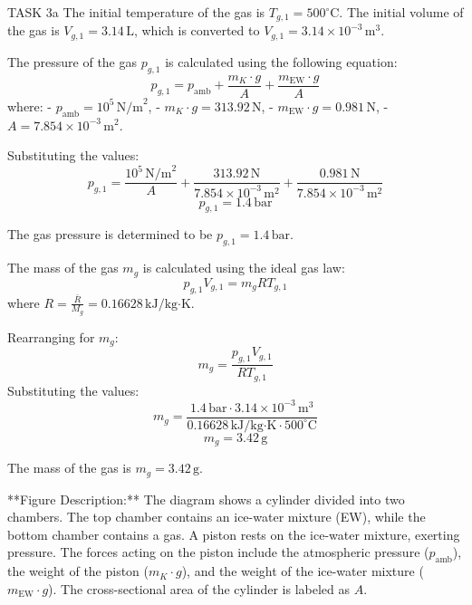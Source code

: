TASK 3a  
The initial temperature of the gas is \( T_{g,1} = 500^\circ\text{C} \).  
The initial volume of the gas is \( V_{g,1} = 3.14 \, \text{L} \), which is converted to \( V_{g,1} = 3.14 \times 10^{-3} \, \text{m}^3 \).  

The pressure of the gas \( p_{g,1} \) is calculated using the following equation:  
\[
p_{g,1} = p_{\text{amb}} + \frac{m_K \cdot g}{A} + \frac{m_{\text{EW}} \cdot g}{A}
\]  
where:  
- \( p_{\text{amb}} = 10^5 \, \text{N/m}^2 \),  
- \( m_K \cdot g = 313.92 \, \text{N} \),  
- \( m_{\text{EW}} \cdot g = 0.981 \, \text{N} \),  
- \( A = 7.854 \times 10^{-3} \, \text{m}^2 \).  

Substituting the values:  
\[
p_{g,1} = \frac{10^5 \, \text{N/m}^2}{A} + \frac{313.92 \, \text{N}}{7.854 \times 10^{-3} \, \text{m}^2} + \frac{0.981 \, \text{N}}{7.854 \times 10^{-3} \, \text{m}^2}
\]  
\[
p_{g,1} = 1.4 \, \text{bar}
\]  

The gas pressure is determined to be \( p_{g,1} = 1.4 \, \text{bar} \).  

The mass of the gas \( m_g \) is calculated using the ideal gas law:  
\[
p_{g,1} V_{g,1} = m_g R T_{g,1}
\]  
where \( R = \frac{\bar{R}}{M_g} = 0.16628 \, \text{kJ/kg·K} \).  

Rearranging for \( m_g \):  
\[
m_g = \frac{p_{g,1} V_{g,1}}{R T_{g,1}}
\]  
Substituting the values:  
\[
m_g = \frac{1.4 \, \text{bar} \cdot 3.14 \times 10^{-3} \, \text{m}^3}{0.16628 \, \text{kJ/kg·K} \cdot 500^\circ\text{C}}
\]  
\[
m_g = 3.42 \, \text{g}
\]  

The mass of the gas is \( m_g = 3.42 \, \text{g} \).  

**Figure Description:**  
The diagram shows a cylinder divided into two chambers. The top chamber contains an ice-water mixture (EW), while the bottom chamber contains a gas. A piston rests on the ice-water mixture, exerting pressure. The forces acting on the piston include the atmospheric pressure (\( p_{\text{amb}} \)), the weight of the piston (\( m_K \cdot g \)), and the weight of the ice-water mixture (\( m_{\text{EW}} \cdot g \)). The cross-sectional area of the cylinder is labeled as \( A \).